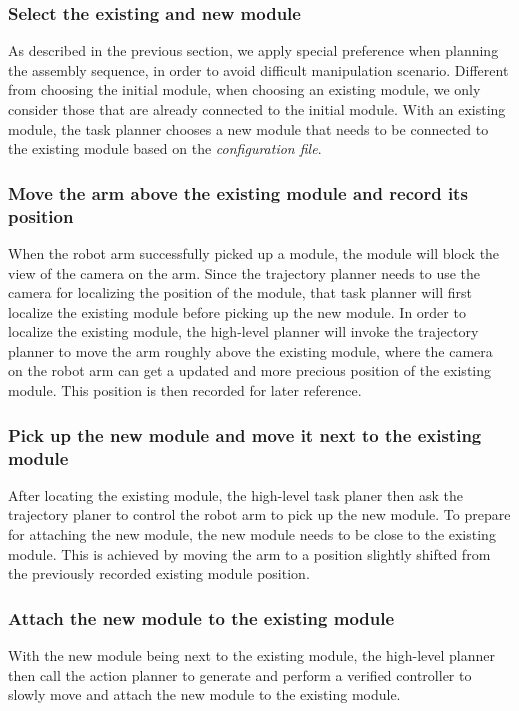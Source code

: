 \subsubsection{Select the existing and new module}\label{sec:nextmodule}
As described in the previous section, we apply special preference when planning the assembly sequence, in order to avoid difficult manipulation scenario.
Different from choosing the initial module, when choosing an existing module, we only consider those that are already connected to the initial module.
With an existing module, the task planner chooses a new module that needs to be connected to the existing module based on the {\it configuration file}.

\subsubsection{Move the arm above the existing module and record its position}
When the robot arm successfully picked up a module, the module will block the view of the camera on the arm.
Since the trajectory planner needs to use the camera for localizing the position of the module, that task planner will first localize the existing module before picking up the new module.
In order to localize the existing module, the high-level planner will invoke the trajectory planner to move the arm roughly above the existing module, where the camera on the robot arm can get a updated and more precious position of the existing module.
This position is then recorded for later reference.

\subsubsection{Pick up the new module and move it next to the existing module}
After locating the existing module, the high-level task planer then ask the trajectory planer to control the robot arm to pick up the new module.
To prepare for attaching the new module, the new module needs to be close to the existing module.
This is achieved by moving the arm to a position slightly shifted from the previously recorded existing module position.

\subsubsection{Attach the new module to the existing module}
With the new module being next to the existing module, the high-level planner then call the action planner to generate and perform a verified controller to slowly move and attach the new module to the existing module.

